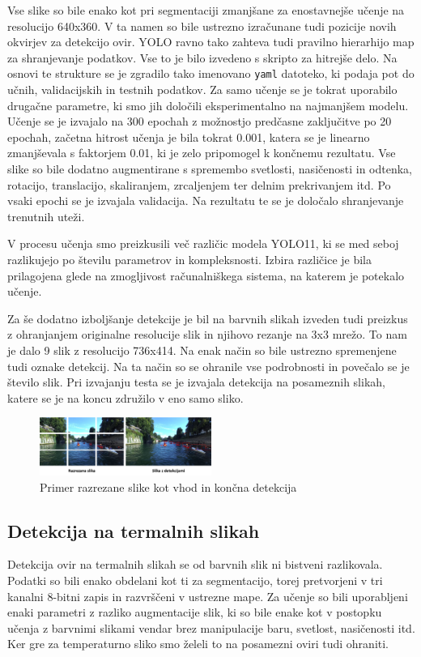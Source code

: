 \documentclass[10pt,twocolumn,letterpaper]{article}
\begin{document}
Vse slike so bile enako kot pri segmentaciji zmanjšane za enostavnejše učenje na resolucijo 640x360. V ta namen so bile ustrezno izračunane tudi pozicije novih okvirjev za detekcijo ovir.
YOLO ravno tako zahteva tudi pravilno hierarhijo map za shranjevanje podatkov. Vse to je bilo izvedeno s skripto za hitrejše delo. Na osnovi te strukture se je zgradilo tako imenovano \texttt{yaml} datoteko, ki podaja pot do učnih, validacijskih in testnih podatkov. 
Za samo učenje se je tokrat uporabilo drugačne parametre, ki smo jih določili eksperimentalno na najmanjšem modelu. Učenje se je izvajalo na 300 epochah z možnostjo predčasne zaključitve po 20 epochah, začetna hitrost učenja je bila tokrat 0.001, katera se je linearno zmanjševala s faktorjem 0.01, ki je zelo pripomogel k končnemu rezultatu. Vse slike so bile dodatno augmentirane s spremembo svetlosti, nasičenosti in odtenka, rotacijo, translacijo, skaliranjem, zrcaljenjem ter delnim prekrivanjem itd. Po vsaki epochi se je izvajala validacija. Na rezultatu te se je določalo shranjevanje trenutnih uteži. 

V procesu učenja smo preizkusili več različic modela YOLO11, ki se med seboj razlikujejo po številu parametrov in kompleksnosti. Izbira različice je bila prilagojena glede na zmogljivost računalniškega sistema, na katerem je potekalo učenje.

Za še dodatno izboljšanje detekcije je bil na barvnih slikah izveden tudi preizkus z ohranjanjem originalne resolucije slik in njihovo rezanje na 3x3 mrežo. To nam je dalo 9 slik z resolucijo 736x414. Na enak način so bile ustrezno spremenjene tudi oznake detekcij. Na ta način so se ohranile vse podrobnosti in povečalo se je število slik. Pri izvajanju testa se je izvajala detekcija na posameznih slikah, katere se je na koncu združilo v eno samo sliko.

\begin{figure}[h!]
    \centering %
    \includegraphics[width=0.5\textwidth]{Slike/Tiled_detection.PNG} %
    \caption{Primer razrezane slike kot vhod in končna detekcija} %
    \label{fig:detekcija_po_delih} %
\end{figure}

\subsection{Detekcija na termalnih slikah}
Detekcija ovir na termalnih slikah se od barvnih slik ni bistveni razlikovala. Podatki so bili enako obdelani kot ti za segmentacijo, torej pretvorjeni v tri kanalni 8-bitni zapis in razvrščeni v ustrezne mape. Za učenje so bili uporabljeni enaki parametri z razliko augmentacije slik, ki so bile enake kot v postopku učenja z barvnimi slikami vendar brez manipulacije baru, svetlost, nasičenosti itd. Ker gre za temperaturno sliko smo želeli to na posamezni oviri tudi ohraniti.
\end{document}
